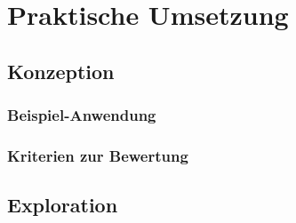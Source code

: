 \part{Praktische Umsetzung} \label{chap:praxis} 

\chapter{Konzeption}	

\section{Beispiel-Anwendung}	\label{sec:bsp-app} 




\section{Kriterien zur Bewertung}	\label{sec:kriterien}

\chapter{Exploration}	\label{sec:explo}	%

